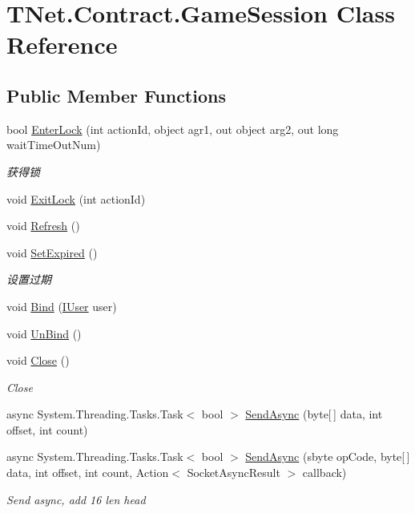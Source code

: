 \hypertarget{class_t_net_1_1_contract_1_1_game_session}{}\section{T\+Net.\+Contract.\+Game\+Session Class Reference}
\label{class_t_net_1_1_contract_1_1_game_session}
\subsection*{Public Member Functions}
\begin{DoxyCompactItemize}
\item 
bool \mbox{\hyperlink{class_t_net_1_1_contract_1_1_game_session_a3d1ecf889379710ce2325d2a6f989777}{Enter\+Lock}} (int action\+Id, object agr1, out object arg2, out long wait\+Time\+Out\+Num)
\begin{DoxyCompactList}\small\item\em 获得锁 \end{DoxyCompactList}\item 
void \mbox{\hyperlink{class_t_net_1_1_contract_1_1_game_session_a4efe81b2af17ed61332d2ae55fa3c2d0}{Exit\+Lock}} (int action\+Id)
\item 
void \mbox{\hyperlink{class_t_net_1_1_contract_1_1_game_session_a41824bc87bd23b84c8ae338b092d1769}{Refresh}} ()
\item 
void \mbox{\hyperlink{class_t_net_1_1_contract_1_1_game_session_a6edaf71a2d0a9c2a64c722d173363b28}{Set\+Expired}} ()
\begin{DoxyCompactList}\small\item\em 设置过期 \end{DoxyCompactList}\item 
void \mbox{\hyperlink{class_t_net_1_1_contract_1_1_game_session_aed518bd0b305cc10225ef785f7d7f86f}{Bind}} (\mbox{\hyperlink{interface_t_net_1_1_context___1_1_i_user}{I\+User}} user)
\item 
void \mbox{\hyperlink{class_t_net_1_1_contract_1_1_game_session_ac416de59932c8bef0c435a2fdad6f9f0}{Un\+Bind}} ()
\item 
void \mbox{\hyperlink{class_t_net_1_1_contract_1_1_game_session_a3fefc89d3c01bc507d858ef6a38af8f3}{Close}} ()
\begin{DoxyCompactList}\small\item\em Close \end{DoxyCompactList}\item 
async System.\+Threading.\+Tasks.\+Task$<$ bool $>$ \mbox{\hyperlink{class_t_net_1_1_contract_1_1_game_session_a2168e48814137103de9d8c581dfdd144}{Send\+Async}} (byte\mbox{[}$\,$\mbox{]} data, int offset, int count)
\item 
async System.\+Threading.\+Tasks.\+Task$<$ bool $>$ \mbox{\hyperlink{class_t_net_1_1_contract_1_1_game_session_a503bc88411d6e9b6ae7f38afd266cf30}{Send\+Async}} (sbyte op\+Code, byte\mbox{[}$\,$\mbox{]} data, int offset, int count, Action$<$ Socket\+Async\+Result $>$ callback)
\begin{DoxyCompactList}\small\item\em Send async, add 16 len head \end{DoxyCompactList}\end{DoxyCompactItemize}
